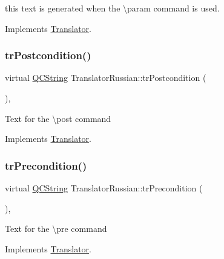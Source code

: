 this text is generated when the \textbackslash{}param command is used. 

Implements \mbox{\hyperlink{class_translator}{Translator}}.

\mbox{\label{class_translator_russian_a030154dd2919f1a145e782f3f8978912}} 
\subsubsection{\texorpdfstring{trPostcondition()}{trPostcondition()}}
{\footnotesize\ttfamily virtual \mbox{\hyperlink{class_q_c_string}{Q\+C\+String}} Translator\+Russian\+::tr\+Postcondition (\begin{DoxyParamCaption}{ }\end{DoxyParamCaption})\hspace{0.3cm}{\ttfamily [inline]}, {\ttfamily [virtual]}}

Text for the \textbackslash{}post command 

Implements \mbox{\hyperlink{class_translator}{Translator}}.

\mbox{\label{class_translator_russian_a4e639a81557e0d4f47f8326d6b809f87}} 
\subsubsection{\texorpdfstring{trPrecondition()}{trPrecondition()}}
{\footnotesize\ttfamily virtual \mbox{\hyperlink{class_q_c_string}{Q\+C\+String}} Translator\+Russian\+::tr\+Precondition (\begin{DoxyParamCaption}{ }\end{DoxyParamCaption})\hspace{0.3cm}{\ttfamily [inline]}, {\ttfamily [virtual]}}

Text for the \textbackslash{}pre command 

Implements \mbox{\hyperlink{class_translator}{Translator}}.

\mbox{\label{class_translator_russian_ae050cf8b98102f05f7377d58dd314cf2}} 
